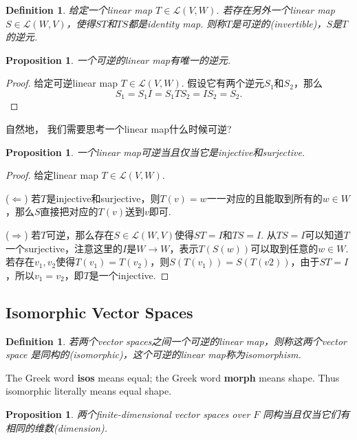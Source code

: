 \documentclass{article}
\newtheorem{proposition}[theorem]{Proposition}
\newtheorem{definition}[theorem]{Definition}
\begin{document}
\begin{definition}
\rm 给定一个linear map $T \in \mathcal{L}(V,W)$. 若存在另外一个linear map $S \in \mathcal{L}(W,V)$，使得$ST$和$TS$都是identity map. 则称$T$是可逆的(invertible)，$S$是$T$的逆元.
\end{definition}

\begin{proposition}
\rm 一个可逆的linear map有唯一的逆元.
\end{proposition}

\begin{proof}
\rm 给定可逆linear map $T \in \mathcal{L}(V,W)$. 假设它有两个逆元$S_1$和$S_2$，那么
$$
S_1 = S_1I = S_1TS_2 = IS_2 =S_2.
$$
\end{proof}

自然地，{\color{red} 我们需要思考一个linear map什么时候可逆}?

\begin{proposition}
\rm 一个linear map可逆当且仅当它是injective和surjective.
\end{proposition}


\begin{proof}
给定linear map $T \in \mathcal{L}(V,W)$. 

($\Leftarrow$)  若$T$是injective和surjective，则$T(v) = w$一一对应的且能取到所有的$w \in W$，那么$S$直接把对应的$T(v)$送到$v$即可.

($\Rightarrow$) 若$T$可逆，那么存在$S \in \mathcal{L}(W,V)$使得$ST = I$和$TS = I$. 从$TS = I$可以知道$T$一个surjective，注意这里的$I$是$W \rightarrow W$，表示$T(S(w))$可以取到任意的$w \in W$. 若存在$v_1,v_2$使得$T(v_1) = T(v_2)$，则$S(T(v_1)) = S(T(v2))$，由于$ST = I$，所以$v_1 = v_2$，即$T$是一个injective. 
\end{proof}

\newpage
\subsection{Isomorphic Vector Spaces}

\begin{definition}
\rm 若两个vector spaces之间一个可逆的linear map，则称这两个vector space 是同构的(isomorphic)，这个可逆的linear map称为isomorphism.
\end{definition}

{\color{blue} The Greek word \textbf{isos} means equal; the Greek word \textbf{morph} means shape. Thus isomorphic literally means equal shape}.

\begin{proposition}
\rm 两个finite-dimensional vector spaces over $F$ 同构当且仅当它们有相同的维数(dimension).
\end{proposition}
\end{document}
